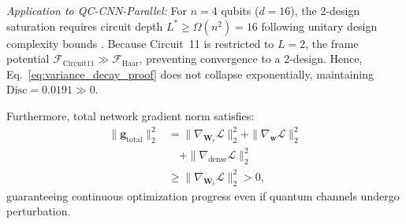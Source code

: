 \documentclass[pdflatex,sn-mathphys-num]{sn-jnl}%
\theoremstyle{thmstyleone}%
\theoremstyle{thmstyletwo}%
\theoremstyle{thmstylethree}%
\begin{document}
\textit{Application to QC-CNN-Parallel:} For $n=4$ qubits ($d=16$), the 2-design saturation requires circuit depth $L^* \ge \Omega(n^2) = 16$ following unitary design complexity bounds \cite{haferkamp2022linear}. Because Circuit~11 is restricted to $L=2$, the frame potential $\mathcal{F}_{\mathrm{Circuit11}} \gg \mathcal{F}_{\mathrm{Haar}}$, preventing convergence to a 2-design. Hence, Eq.~\eqref{eq:variance_decay_proof} does not collapse exponentially, maintaining $\mathrm{Disc} = 0.0191 \gg 0$.

Furthermore, total network gradient norm satisfies:
\begin{align}
\|\mathbf{g}_{\mathrm{total}}\|_2^2 &= \|\nabla_{\mathbf{W}_c} \mathcal{L}\|_2^2 + \|\nabla_{\mathbf{w}} \mathcal{L}\|_2^2 \nonumber \\
&\quad + \|\nabla_{\mathrm{dense}} \mathcal{L}\|_2^2 \nonumber \\
&\ge \|\nabla_{\mathbf{W}_c} \mathcal{L}\|_2^2 > 0,
\label{eq:total_gradient_lower_bound}
\end{align}
guaranteeing continuous optimization progress even if quantum channels undergo perturbation.
\end{document}
